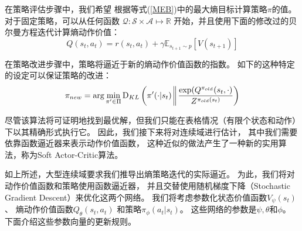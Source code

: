 \documentclass[AutoFakeBold]{LZUThesis}
\begin{document}
在策略评估步骤中，我们希望
根据等式(\ref{MEB})中的最大熵目标计算策略$\pi$的值。
对于固定策略，可以从任何函数
$\mathcal{Q} : \mathcal{S} \times \mathcal{A} \mapsto \mathbb{R}$
开始，并且使用下面的修改过的贝尔曼方程迭代计算熵动作价值：
\begin{equation}
  Q(s_t, a_t) = r(s_t, a_t) + \gamma 
  \mathbb{E}_{s_{t + 1} \sim p} \left[ V(s_{t + 1}) \right]
\end{equation}

在策略改进步骤中，策略将逼近于新的熵动作价值函数的指数。
如下的这种特定的设定可以保证策略的改进\cite{haarnoja_soft_2018, sharma_introduction_1998}：
\begin{equation}
  \pi_{new} = \arg \min_{\pi^\prime \in \Pi} \mathrm{D}_{KL} 
  \left( \pi^\prime(\cdot | s_t) \bigg\Arrowvert
  \frac{\exp(Q^{\pi_{old}}(s_t, \cdot)}{Z^{\pi_{old}(s_t)}} \right)
  \label{pi_upd}
\end{equation}

尽管该算法将可证明地找到最优解，但我们只能在表格情况（有限个状态和动作）下以其精确形式执行它。
因此，我们接下来将对连续域进行估计，
其中我们需要依靠函数逼近器来表示动作价值函数，
这种近似的做法产生了一种新的实用算法，称为Soft Actor-Critic算法。

如上所述，大型连续域要求我们推导出熵策略迭代的实际逼近。
为此，我们将对动作价值函数和策略使用函数逼近器，
并且交替使用随机梯度下降（Stochastic Gradient Descent）来优化这两个网络。
我们将考虑参数化状态价值函数$V_\psi(s_t)$、
熵动作价值函数$Q_\theta(s_t,a_t)$
和策略$\pi_{\phi}(a_t|s_t)$。
这些网络的参数是$ \psi, \theta$和$\phi$。
下面介绍这些参数向量的更新规则。
\end{document}
